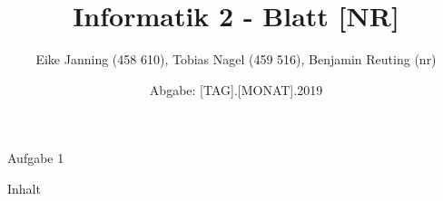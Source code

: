 \documentclass[11pt]{article}
\title{Informatik 2 - Blatt [NR]}
\author{Eike Janning (458 610), Tobias Nagel (459 516), Benjamin Reuting (nr)}
\date{Abgabe: [TAG].[MONAT].2019}
\begin{document}
\maketitle

Aufgabe 1

Inhalt
\end{document}
